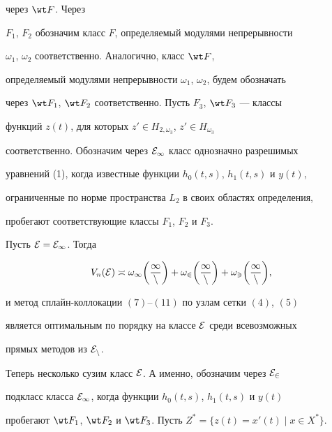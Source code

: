через $\wt F$. Через 


$F_1$, $F_2$ обозначим класс $F$, определяемый модулями непрерывности 


$\omega_1$, $\omega_2$ соответственно. Аналогично, класс $\wt F$, 


определяемый модулями непрерывности $\omega_1$, $\omega_2$, будем обозначать 


через $\wt F_1$, $\wt F_2$ соответственно. Пусть $F_3$, $\wt F_3$ --- классы 


функций $z(t)$, для которых $z'\in H_{2,\omega_3}$, $z'\in H_{\omega_3}$ 


соответственно. Обозначим через $\cal E_1$ класс однозначно разрешимых 


уравнений (1), когда известные функции $h_0(t,s)$, $h_1(t,s)$ и $y(t)$, 


ограниченные по норме пространства $L_2$ в своих областях определения, 


пробегают соответствующие классы $F_1$, $F_2$ и $F_3$. 


 


 


\begin{thm} 


Пусть $\cal E=\cal E_1$. Тогда 


$$ 


V_n(\cal E)\asymp\omega_1\bigg(\frac{1}{n} \bigg)+\omega_2 


\bigg(\frac{1}{n} \bigg)+\omega_3\bigg(\frac{1}{n} \bigg), 


$$ 


и метод сплайн-коллокации $(7)$--$(11)$ по узлам сетки $(4)$, $(5)$ 


является оптимальным по порядку на классе $\cal E$ среди всевозможных 


прямых методов из $\cal E_n$. 


\end{thm} 


 


 


Теперь несколько сузим класс $\cal E$. А именно, обозначим через $\cal E_2$ 


подкласс класса $\cal E_1$, когда функции $h_0(t,s)$, $h_1(t,s)$ и $y(t)$ 


пробегают $\wt F_1$, $\wt F_2$ и $\wt F_3$. Пусть $Z^*=\{z(t)= x'(t)\mid x\in 


X^*\}$. 


